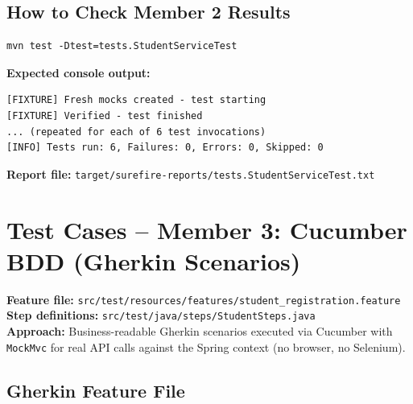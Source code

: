 \documentclass[12pt,a4paper]{article}
\begin{document}
\subsection{How to Check Member 2 Results}

\begin{lstlisting}[style=shellStyle, numbers=none]
mvn test -Dtest=tests.StudentServiceTest
\end{lstlisting}

\textbf{Expected console output:}

\begin{lstlisting}[style=shellStyle, numbers=none]
[FIXTURE] Fresh mocks created - test starting
[FIXTURE] Verified - test finished
... (repeated for each of 6 test invocations)
[INFO] Tests run: 6, Failures: 0, Errors: 0, Skipped: 0
\end{lstlisting}

\textbf{Report file:} \texttt{target/surefire-reports/tests.StudentServiceTest.txt}

\section{Test Cases -- Member 3: Cucumber BDD (Gherkin Scenarios)}

\textbf{Feature file:} \texttt{src/test/resources/features/student\_registration.feature}\\
\textbf{Step definitions:} \texttt{src/test/java/steps/StudentSteps.java}\\
\textbf{Approach:} Business-readable Gherkin scenarios executed via Cucumber
with \texttt{MockMvc} for real API calls against the Spring context (no browser, no Selenium).

\subsection{Gherkin Feature File}
\end{document}
